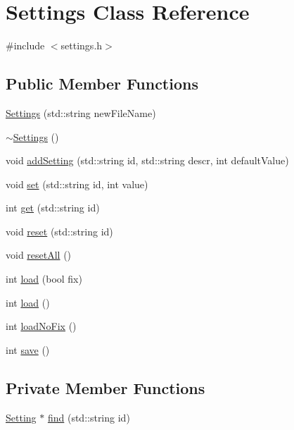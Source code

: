 \hypertarget{classSettings}{}\section{Settings Class Reference}
\label{classSettings}


{\ttfamily \#include $<$settings.\+h$>$}

\subsection*{Public Member Functions}
\begin{DoxyCompactItemize}
\item 
\hyperlink{classSettings_ab7b5df0aa5e63fcc91b1e28143e35eef}{Settings} (std\+::string new\+File\+Name)
\item 
\hyperlink{classSettings_a4a65be5921dfc9fddc476e5320541d89}{$\sim$\+Settings} ()
\item 
void \hyperlink{classSettings_aee6c7f37b5ffe69a7b605cd656202c3d}{add\+Setting} (std\+::string id, std\+::string descr, int default\+Value)
\item 
void \hyperlink{classSettings_a2ed21ce3e76ab2c34ac8684c26ae951f}{set} (std\+::string id, int value)
\item 
int \hyperlink{classSettings_ae2aff237502f56739fff3d664cb0fa99}{get} (std\+::string id)
\item 
void \hyperlink{classSettings_a8976b08faf595d3da853e59d4f79e45d}{reset} (std\+::string id)
\item 
void \hyperlink{classSettings_a921ad66038065757097cb9d199bedde9}{reset\+All} ()
\item 
int \hyperlink{classSettings_a279cf292787918f777bc43f201a14a99}{load} (bool fix)
\item 
int \hyperlink{classSettings_a2042818d2c6767f73c5c4e9eeac23b61}{load} ()
\item 
int \hyperlink{classSettings_a8bfa41f6c8f6eb48d116f96115d9793d}{load\+No\+Fix} ()
\item 
int \hyperlink{classSettings_ab017f1e06b354b016ade4f17637397be}{save} ()
\end{DoxyCompactItemize}
\subsection*{Private Member Functions}
\begin{DoxyCompactItemize}
\item 
\hyperlink{structSetting}{Setting} $\ast$ \hyperlink{classSettings_a2b56d0b78408481c275da23598a7d77d}{find} (std\+::string id)
\end{DoxyCompactItemize}
